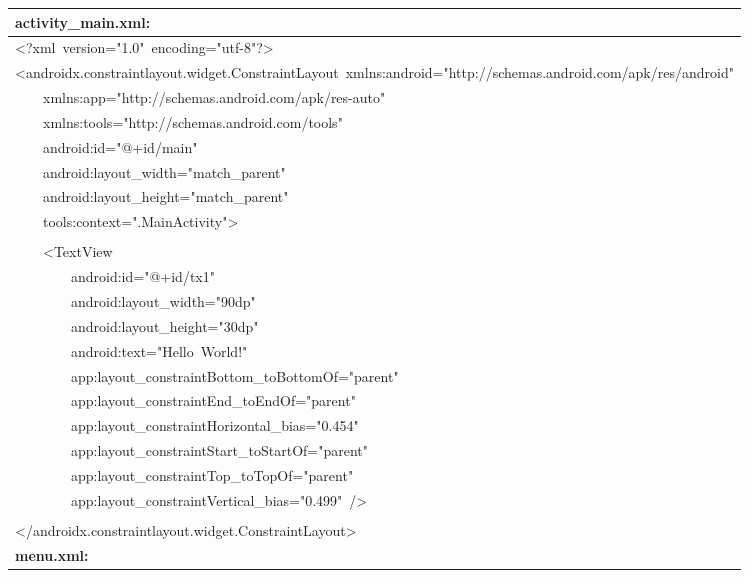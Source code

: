 \documentclass[a4paper,12pt]{article}
\begin{document}
\begin{longtable}{|p{}|}
\hline
\rule{0pt}{13pt}\textbf{activity\_main.xml:} \\
\hline
{\ttfamily\small \textless{}?xml\ version="1.0"\ encoding="utf-8"?\textgreater{}} \\
{\ttfamily\small \textless{}androidx.constraintlayout.widget.ConstraintLayout\ xmlns:android="http://schemas.android.com/apk/res/android"} \\
{\ttfamily\small \ \ \ \ xmlns:app="http://schemas.android.com/apk/res-auto"} \\
{\ttfamily\small \ \ \ \ xmlns:tools="http://schemas.android.com/tools"} \\
{\ttfamily\small \ \ \ \ android:id="@+id/main"} \\
{\ttfamily\small \ \ \ \ android:layout\_width="match\_parent"} \\
{\ttfamily\small \ \ \ \ android:layout\_height="match\_parent"} \\
{\ttfamily\small \ \ \ \ tools:context=".MainActivity"\textgreater{}} \\
\strut \\
{\ttfamily\small \ \ \ \ \textless{}TextView} \\
{\ttfamily\small \ \ \ \ \ \ \ \ android:id="@+id/tx1"} \\
{\ttfamily\small \ \ \ \ \ \ \ \ android:layout\_width="90dp"} \\
{\ttfamily\small \ \ \ \ \ \ \ \ android:layout\_height="30dp"} \\
{\ttfamily\small \ \ \ \ \ \ \ \ android:text="Hello\ World!"} \\
{\ttfamily\small \ \ \ \ \ \ \ \ app:layout\_constraintBottom\_toBottomOf="parent"} \\
{\ttfamily\small \ \ \ \ \ \ \ \ app:layout\_constraintEnd\_toEndOf="parent"} \\
{\ttfamily\small \ \ \ \ \ \ \ \ app:layout\_constraintHorizontal\_bias="0.454"} \\
{\ttfamily\small \ \ \ \ \ \ \ \ app:layout\_constraintStart\_toStartOf="parent"} \\
{\ttfamily\small \ \ \ \ \ \ \ \ app:layout\_constraintTop\_toTopOf="parent"} \\
{\ttfamily\small \ \ \ \ \ \ \ \ app:layout\_constraintVertical\_bias="0.499"\ /\textgreater{}} \\
\strut \\
{\ttfamily\small \textless{}/androidx.constraintlayout.widget.ConstraintLayout\textgreater{}} \\
\hline
\rule{0pt}{13pt}\textbf{menu.xml:} \\

\end{longtable}
\end{document}
